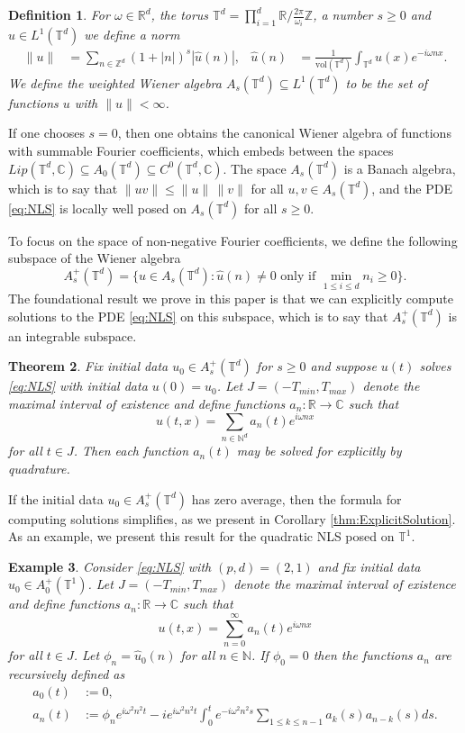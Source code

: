 \documentclass{article}
\newtheorem{theorem}{Theorem}[section]
\newtheorem{definition}[theorem]{Definition}
\newtheorem{example}[theorem]{Example}
\newcommand{\R}{\mathbb{R}}
\newcommand{\C}{\mathbb{C}}
\newcommand{\N}{\mathbb{N}}
\newcommand{\Z}{\mathbb{Z}}
\newcommand{\T}{\mathbb{T}}
\begin{document}
\begin{definition}
	For $\omega \in \R^{d} $, the torus $\T^d = \prod_{i=1}^d \R / \frac{2 \pi}{\omega_i} \Z$, a number $s \geq 0$ and $ u \in L^1(\T^d)$ we define a norm 
	\begin{align*}
	\| u \| &= \sum_{n \in \Z^d} (1+|n|)^s | \hat{u}(n) | ,
	&
	\hat{u}(n) &= \frac{1}{\mbox{vol}(\T^d)} \int_{\T^d} u(x) e^{-i \omega n x}.
	\end{align*}
	We define the weighted Wiener algebra $ A_s(\T^d) \subseteq L^1(\T^d)$ to be the set of functions $ u $ with $ \|u\| < \infty$.
\end{definition} 
If one chooses $s=0$, then one obtains the canonical  Wiener algebra of functions with summable Fourier coefficients, which embeds between the spaces  $ Lip(\T^d,\C)  \subseteq A_0(\T^d) \subseteq C^0(\T^d , \C)	$. 
The space  $A_s(\T^d)$ is a Banach algebra, which is to say that $\| u v\| \leq \|u\|\, \|v \|$ for all $ u,v \in  A_s(\T^d)$, and the PDE \eqref{eq:NLS} is locally well posed on $ A_s(\T^d)$  for all $ s \geq 0$.

 To focus on the space of non-negative Fourier coefficients,  we define the following subspace of the Wiener algebra 
 \[
 A^+_{s}(\T^d) = 
 \{
 u \in A_s ( \T^d) :   \hat{u}(n) \neq 0 \mbox{ only if } \min_{1 \leq i \leq d} n_i \geq  0  
 \} .
 \]
 The foundational result we prove in this paper is that we can explicitly compute solutions to the PDE \eqref{eq:NLS} on this subspace, which is to say that   $ A^+_{s}(\T^d)$ is an integrable subspace. 
 
  
 \begin{theorem} \label{prop:Intro_Integrability}
 	Fix initial data $ u_0 \in A_s^+(\T^d)$ for $ s \geq 0$ and suppose $u(t)$ solves \eqref{eq:NLS}  with initial data $ u(0) = u_0$. 
 	Let $ J = (-T_{min},T_{max})$ denote the maximal interval of existence and define functions $a_n : \R\to \C$ such that  
 	\[
 	u(t,x) = \sum_{n \in \N^d} a_n(t) e^{i \omega n x}
 	\]
 	for all $ t \in J$. 
 	Then each  function $ a_n(t)$ may be solved for explicitly by quadrature.
 \end{theorem}
 
 If the initial data $u_0 \in A_s^+(\T^d)$ has zero average, then the formula for computing solutions simplifies, as we present in Corollary \ref{thm:ExplicitSolution}. As an example, we present this result for the quadratic NLS posed on $\T^1$. 
\begin{example}	
	\label{eg:Recursive}
	Consider \eqref{eq:NLS} with $(p,d)=(2,1)$ and fix initial data $ u_0 \in A_0^+(\T^1)$.   
	Let $ J = (-T_{min},T_{max})$ denote the maximal interval of existence and define functions $a_n : \R\to \C$ such that  
	\[
	u(t,x) = \sum_{n=0}^\infty  a_n(t) e^{i \omega n x}
	\]
	for all $ t \in J$. Let  $ \phi_n = \hat{u}_0(n)$ for all $ n \in \N$. If $ \phi_0 = 0$ then the functions $a_n $ are recursively defined as 
	\begin{align*} 
	a_0(t) &:=  0 , \\
	a_n(t) &:= \phi_n e^{i \omega^2 n^2 t}  -  i e^{i \omega^2 n^2 t} 
	\int_0^t  e^{-i \omega^2 n^2 s} \sum_{1\leq k \leq n-1} a_{k}(s) a_{n-k}(s) ds. 
	\end{align*}
\end{example}
\end{document}
